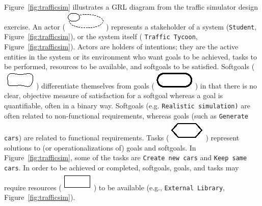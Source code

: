 Figure~\ref{fig:trafficsim} illustrates a GRL diagram from the traffic simulator design exercise. An actor (\includegraphics[scale=1]{img/actor}) represents a stakeholder of a system (\texttt{Student}, Figure~\ref{fig:trafficsim}), or the system itself ( \texttt{Traffic Tycoon}, Figure~\ref{fig:trafficsim}). Actors are holders of intentions; they are the active entities in the system or its environment who want goals to be achieved, tasks to be performed, resources to be available, and softgoals to be satisfied. Softgoals (\includegraphics[scale=1]{img/softgoal}) differentiate themselves from goals (\includegraphics[scale=1]{img/goal}) in that there is no clear, objective measure of satisfaction for a softgoal whereas a goal is quantifiable, often in a binary way. Softgoals (e.g.  \texttt{Realistic simulation)} are often related to non-functional requirements, whereas goals (such as  \texttt{Generate cars}) are related to functional requirements. Tasks (\includegraphics[scale=1]{img/task}) represent solutions to (or operationalizations of) goals and softgoals. In Figure~\ref{fig:trafficsim}, some of the tasks are  \texttt{Create new cars} and \texttt{Keep same cars}. In order to be achieved or completed, softgoals, goals, and tasks may require resources (\includegraphics[scale=1]{img/resource}) to be available (e.g., \texttt{External Library}, Figure~\ref{fig:trafficsim}).

